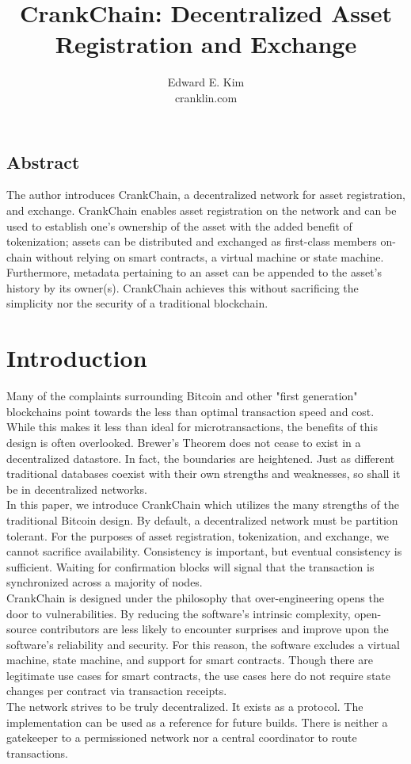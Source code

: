 \documentclass[10pt,twocolumn]{article}
\begin{document}
\title{CrankChain: Decentralized Asset Registration and Exchange}
\author{
{\normalsize Edward E. Kim}\\
\normalsize cranklin.com
}
\date{}

\maketitle
\subsection*{Abstract}
The author introduces CrankChain, a decentralized network for asset registration, and exchange.  CrankChain enables asset registration on the network and can be used to establish one's ownership of the asset with the added benefit of tokenization; assets can be distributed and exchanged as first-class members on-chain without relying on smart contracts, a virtual machine or state machine.  Furthermore, metadata pertaining to an asset can be appended to the asset's history by its owner(s).  CrankChain achieves this without sacrificing the simplicity nor the security of a traditional blockchain.

\section{Introduction}
Many of the complaints surrounding Bitcoin and other "first generation" blockchains point towards the less than optimal transaction speed and cost.  While this makes it less than ideal for microtransactions, the benefits of this design is often overlooked.  Brewer's Theorem does not cease to exist in a decentralized datastore.  In fact, the boundaries are heightened.  Just as different traditional databases coexist with their own strengths and weaknesses, so shall it be in decentralized networks.\\
In this paper, we introduce CrankChain which utilizes the many strengths of the traditional Bitcoin design.  By default, a decentralized network must be partition tolerant.  For the purposes of asset registration, tokenization, and exchange, we cannot sacrifice availability.  Consistency is important, but eventual consistency is sufficient.  Waiting for confirmation blocks will signal that the transaction is synchronized across a majority of nodes.  \\
CrankChain is designed under the philosophy that over-engineering opens the door to vulnerabilities.  By reducing the software's intrinsic complexity, open-source contributors are less likely to encounter surprises and improve upon the software's reliability and security.  For this reason, the software excludes a virtual machine, state machine, and support for smart contracts.  Though there are legitimate use cases for smart contracts, the use cases here do not require state changes per contract via transaction receipts.  \\
The network strives to be truly decentralized.  It exists as a protocol.  The implementation can be used as a reference for future builds.  There is neither a gatekeeper to a permissioned network nor a central coordinator to route transactions.
\end{document}
